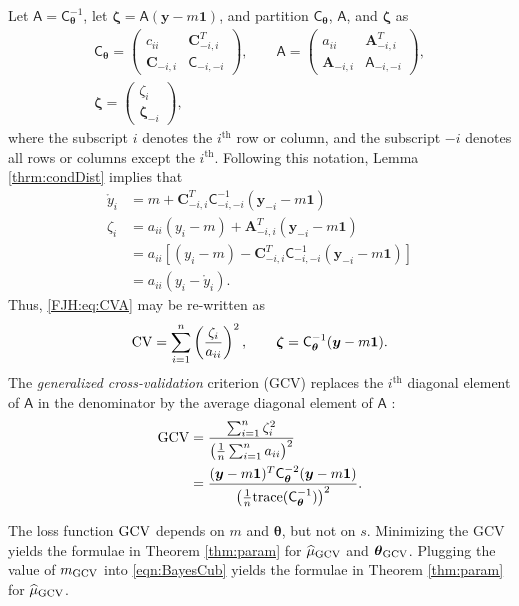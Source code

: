 \documentclass[twocolumn]{svjour3}          %
\newcommand{\bm}[1]{\boldsymbol{#1}}
\newcommand{\trace}[1]{\textup{trace}{#1}}
\newcommand{\vtheta}{{\bm{\theta}}}
\newcommand{\vzeta}{{\bm{\zeta}}}
\newcommand{\vA}{\bm{A}}
\newcommand{\vC}{\bm{C}}
\newcommand{\vy}{\bm{y}}
\newcommand{\vone}{\bm{1}}
\newcommand{\mA}{\mathsf{A}}
\newcommand{\mC}{\mathsf{C}}
\newcommand{\GCV}{\textup{GCV}}
\begin{document}
Let $\mA = \mC^{-1}_\vtheta$, let $\vzeta = \mA (\vy - m \vone)$, and partition $\mC_\vtheta$, $\mA$, and $\vzeta$ as
\begin{gather*}
\mC_\vtheta = \begin{pmatrix} c_{ii}  & \vC_{-i,i}^T \\  \vC_{-i,i} & \mC_{-i,-i}\end{pmatrix}, \qquad
\mA = \begin{pmatrix} a_{ii}  & \vA_{-i,i}^T \\  \vA_{-i,i} & \mA_{-i,-i}\end{pmatrix}, \\ \vzeta = \begin{pmatrix} \zeta_i   \\  \vzeta_{-i} \end{pmatrix},
\end{gather*}
where the subscript $i$ denotes the $i^{\text{th}}$ row or column, and the subscript $-i$ denotes all rows or columns except the $i^{\text{th}}$. Following this notation, Lemma \ref{thrm:condDist} implies that 
\begin{align*}
\mathring{y}_i & = m + \vC^T_{-i,i} \mC_{-i,-i}^{-1} (\vy_{-i} -m \vone)  \\
\zeta_i  & = a_{ii}(y_i - m) + \vA_{-i,i}^T(\vy_{-i} - m \vone) \\
& = a_{ii}[(y_i - m) - \vC^T_{-i,i} \mC_{-i,-i}^{-1} (\vy_{-i} -m \vone)] \\
& = a_{ii}(y_i - \mathring{y}_i).
\end{align*}
Thus, \eqref{FJH:eq:CVA} may be re-written as 
\begin{align*} %
\textup{CV} = \sum_{i=1}^n \left(\frac{\zeta_i}{a_{ii}} \right)^2, \qquad \vzeta = \mC^{-1}_\vtheta(\vy - m \vone).
\end{align*}
The \emph{generalized cross-validation} criterion (GCV) replaces the $i^{\text{th}}$ diagonal element of $\mA$ in the denominator by the average diagonal element of $\mA$ \cite{CraWah79a,GolHeaWah79a,Wah90}:
\begin{align*} 
\textup{GCV} &
= \frac{\sum_{i=1}^n\zeta_i^2}{\left(\frac 1n \sum_{i=1}^n a_{ii} \right)^2} \\
& = \frac{(\vy - m\vone)^T \mC^{-2}_\vtheta (\vy - m \vone)}{\left(\frac 1n \trace(\mC_\vtheta^{-1}) \right)^2}.
\end{align*}

The loss function $\textup{GCV}$ depends on $m$ and $\vtheta$, but not on $s$.  Minimizing the GCV  yields the formulae in Theorem \ref{thm:param} for $\widehat{\mu}_{\textup{GCV}}$ and $\vtheta_{\textup{GCV}}$.  
Plugging the value of $m_\GCV$ into \eqref{eqn:BayesCub} yields the formulae in Theorem \ref{thm:param} for $\widehat{\mu}_{\textup{GCV}}$.
\end{document}
